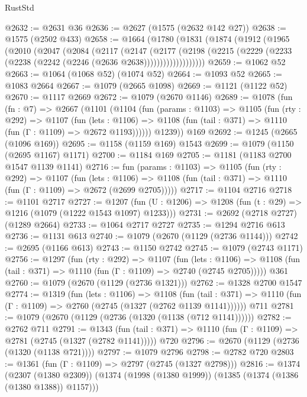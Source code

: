 \begin{lexlean}{RustStd}
\begin{coremodule}
@2632 := @2631 @36
@2636 := @2627 (@1575 (@2632 @142 @27))
@2638 := @1575 (@2502 @433)
@2658 := @1664
    (@1780
      (@1831
        (@1874
          (@1912
            (@1965
              (@2010
                (@2047
                  (@2084
                    (@2117
                      (@2147
                        (@2177
                          (@2198
                            (@2215
                              (@2229 (@2233 (@2238 (@2242 (@2246 (@2636 @2638)))))))))))))))))))
@2659 := @1062 @52
@2663 := @1064 (@1068 @52) (@1074 @52)
@2664 := @1093 @52
@2665 := @1083 @2664
@2667 := @1079 (@2665 @1098)
@2669 := @1121 (@1122 @52)
@2670 := @1117 @2669
@2672 := @1079 (@2670 @1146)
@2689 := @1078
    (fun (fn : @7) =>
    @2667
      (@1101
        (@1104
          (fun (params : @1103) =>
          @1105
            (fun (rty : @292) =>
            @1107
              (fun (lets : @1106) =>
              @1108 (fun (tail : @371) => @1110 (fun (Γ : @1109) => @2672 @1193))))))
        @1239))
    @169
@2692 := @1245 (@2665 (@1096 @169))
@2695 := @1158 (@1159 @169) @1543
@2699 := @1079 (@1150 (@2695 @1167) @1171)
@2700 := @1184 @169
@2705 := @1181 (@1183 @2700 @1547 @1139 @1141)
@2716 := fun (params : @1103) =>
  @1105
    (fun (rty : @292) =>
    @1107
      (fun (lets : @1106) =>
      @1108 (fun (tail : @371) => @1110 (fun (Γ : @1109) => @2672 (@2699 @2705)))))
@2717 := @1104 @2716
@2718 := @1101 @2717
@2727 := @1207 (fun (U : @1206) => @1208 (fun (t : @29) => @1216 (@1079 (@1222 @1543 @1097) @1233)))
@2731 := @2692 (@2718 @2727) (@1289 @2664)
@2733 := @1064 @2717 @2727
@2735 := @1294 @2716 @613
@2736 := @1131 @613
@2740 := @1079 (@2670 (@1129 (@2736 @1144)))
@2742 := @2695 (@1166 @613)
@2743 := @1150 @2742
@2745 := @1079 (@2743 @1171)
@2756 := @1297
    (fun (rty : @292) =>
    @1107
      (fun (lets : @1106) =>
      @1108 (fun (tail : @371) => @1110 (fun (Γ : @1109) => @2740 (@2745 @2705)))))
    @361
@2760 := @1079 (@2670 (@1129 (@2736 @1321)))
@2762 := @1328 @2700 @1547
@2774 := @1319
    (fun (lets : @1106) =>
    @1108
      (fun (tail : @371) => @1110 (fun (Γ : @1109) => @2760 (@2745 (@1327 (@2762 @1139 @1141))))))
    @711
@2781 := @1079 (@2670 (@1129 (@2736 (@1320 (@1138 (@712 @1141))))))
@2782 := @2762 @711
@2791 := @1343
    (fun (tail : @371) => @1110 (fun (Γ : @1109) => @2781 (@2745 (@1327 (@2782 @1141)))))
    @720
@2796 := @2670 (@1129 (@2736 (@1320 (@1138 @721))))
@2797 := @1079 @2796
@2798 := @2782 @720
@2803 := @1361 (fun (Γ : @1109) => @2797 (@2745 (@1327 @2798)))
@2816 := @1374
    (@2307 (@1380 @2309))
    (@1374 (@1998 (@1380 @1999)) (@1385 (@1374 (@1386 (@1380 @1388)) @1157)))

\end{coremodule}
\end{lexlean}
